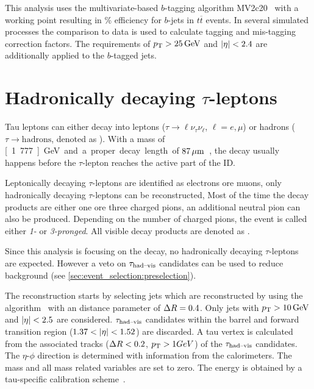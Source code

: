 This analysis uses the multivariate-based $b$-tagging algorithm MV2c20~\cite{PERF-2012-04,ATL-PHYS-PUB-2016-012} with
a working point resulting in \unit[85]{\%} efficiency for $b$-jets in $t\overline{t}$ events. In several simulated processes
the comparison to data is used to calculate tagging and mis-tagging correction factors.
The requirements of $\pt > \unit[25]{GeV}$ and $\left|\eta\right| < 2.4$ are additionally applied to the $b$-tagged jets.


\section{Hadronically decaying  $\tau$-leptons}\label{sec:object_selection:tau_leptons}

Tau leptons can either decay into leptons ($\tau \to \ell \nu_\tau \nu_\ell$, $\ell = e, \mu$) or hadrons
($\tau \to \text{hadrons}$, denoted as \tauhad{}).
With a mass of \unit[1.777]{GeV} and a proper decay length of $\unit[87]{\mu m}$~\cite{PDG}, the decay usually happens before
the $\tau$-lepton reaches the active part of the ID\@.

Leptonically decaying $\tau$-leptons are identified as electrons ore muons, only hadronically decaying $\tau$-leptons can be reconstructed,
Most of the time the decay products are either one ore three charged pions, an additional neutral pion can also be produced.
Depending on the number of charged pions, the event is called either \emph{1-} or \emph{3-pronged}.
All visible decay products are denoted as \tauhadvis{}.

Since this analysis is focusing on the \Httllfull{} decay, no hadronically decaying $\tau$-leptons are expected.
However a veto on $\tau_\text{had--vis}$ candidates can be used to reduce background (see \cref{sec:event_selection:preselection}).

The reconstruction starts by selecting jets which are reconstructed by using the \antikt{} algorithm~\cite{Cacciari:2008gp,Cacciari:2005hq}
with an distance parameter of $\Delta R = 0.4$.
Only jets with $\pt > \unit[10]{GeV}$ and $\left|\eta\right| < 2.5$ are considered.
$\tau_\text{had--vis}$ candidates within the barrel and  forward transition region ($1.37 < \left|\eta\right| < 1.52$) are discarded.
A tau vertex is calculated from the associated tracks ($\Delta R < 0.2$, $p_\text{T} > 1 GeV$) of the $\tau_\text{had--vis}$ candidates.
The $\eta$-$\phi$ direction is determined with information from the calorimeters. %
The mass and all mass related variables are set to zero.
The energy is  obtained by a tau-specific calibration scheme~\cite{Run1TauPaper}.

